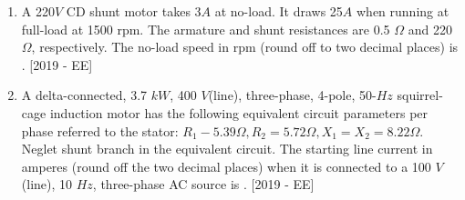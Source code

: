 \documentclass[journal]{IEEEtran}
\begin{document}
\begin{enumerate}
\item A 220$V$ CD shunt motor takes 3$A$ at no-load. It draws 25$A$ when running at full-load at 1500 rpm. The armature and shunt resistances are 0.5 $\Omega$ and 220 $\Omega$, respectively. The no-load speed in rpm (round off to two decimal places) is \underline{\hspace{3cm}}. \hfill{[2019 - EE]}
\item A delta-connected, 3.7 $kW$, 400 $V$(line), three-phase, 4-pole, 50-$Hz$ squirrel-cage induction motor has the following equivalent circuit parameters per phase referred to the stator: $R_1 - 5.39 \Omega, R_2 = 5.72 \Omega, X_1 = X_2 = 8.22 \Omega$. Neglet shunt branch in the equivalent circuit. The starting line current in amperes (round off the two decimal places) when it is connected to a 100 $V$ (line), 10 $Hz$, three-phase AC source is \underline{\hspace{3cm}}. \hfill{[2019 - EE]}


\end{enumerate}
\end{document}
